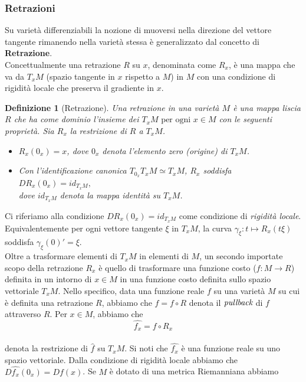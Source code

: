 \documentclass[a4paper, 12pt]{article}
\newtheorem{definition}{Definizione}
\begin{document}
\subsubsection{Retrazioni} \label{retraction}
Su varietà differenziabili la nozione di muoversi nella direzione del vettore tangente rimanendo nella varietà stessa è generalizzato dal concetto di \textbf{Retrazione}.\\
Concettualmente una retrazione $R$ su $x$, denominata come $R_x$, è una mappa che va da $T_xM$ (spazio tangente in $x$ rispetto a $M$) in $M$ con una condizione di rigidità locale che preserva il gradiente in $x$.
\begin{definition}[Retrazione]
Una retrazione in una varietà $M$ è una mappa liscia $R$ che ha come dominio l'insieme dei $T_xM \mbox{ per ogni } x \in M$ con le seguenti proprietà. Sia $R_x$ la restrizione di $R$ a $T_xM$.
\begin{itemize}
  \item $R_x(0_x) = x$, dove $0_x$ denota l'elemento zero (origine) di $T_xM$.
  \item Con l'identificazione canonica $T_{0_x} T_xM \simeq T_xM$, $R_x$ soddisfa\\
  $DR_x(0_x) = id_{T_xM},$\\
  dove $id_{T_xM}$ denota la mappa identità su $T_xM$.
\end{itemize}
\end{definition}
Ci riferiamo alla condizione $DR_x(0_x) = id_{T_xM}$ come condizione di \emph{rigidità locale}. Equivalentemente per ogni vettore tangente $\xi$ in $T_xM$, la curva $\gamma_{\xi}:t \mapsto R_x(t\xi)$ soddisfa $\gamma_{\xi}(0)' = \xi$.\\
Oltre a trasformare elementi di $T_xM$ in elementi di $M$, un secondo importate scopo della retrazione $R_x$ è quello di trasformare una funzione costo ($f:M \to R$) definita in un intorno di $x \in M$ in una funzione costo definita sullo spazio vettoriale $T_xM$. Nello specifico, data una funzione reale $f$ su una varietà $M$ su cui è definita una retrazione $R$, abbiamo che $\hat{f} = f \circ R$ denota il $\emph{pullback}$ di $f$ attraverso $R$. Per $x \in M$, abbiamo che\\
\[\hat{f_x} = f \circ R_x\]\\
denota la restrizione di $\hat{f}$ su $T_xM$. Si noti che $\hat{f_x}$ è una funzione reale su uno spazio vettoriale. Dalla condizione di rigidità locale abbiamo che $D\hat{f_x}(0_x) = Df(x)$. Se $M$ è dotato di una metrica Riemanniana abbiamo\\
\end{document}
